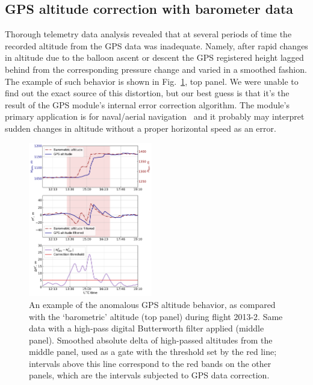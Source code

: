 \documentclass[final,5p,times,twocolumn]{elsarticle}
\begin{document}
\subsection{GPS altitude correction with barometer data}
\label{sect:gps_correction}

Thorough telemetry data analysis revealed that at several periods of time the recorded altitude from the GPS data was inadequate. Namely, after rapid changes in altitude due to the balloon ascent or descent the GPS registered height lagged behind from the corresponding pressure change and varied in a smoothed fashion. The example of such behavior is shown in Fig.~\ref{fig:h_corr}, top panel. We were unable to find out the exact source of this distortion, but our best guess is that it's the result of the GPS module's internal error correction algorithm. The module's primary application is for naval/aerial navigation~\cite{GPS-module-specs} and it probably may interpret sudden changes in altitude without a proper horizontal speed as an error.

\begin{figure}[tb]
    \includegraphics[width=0.48\textwidth]{height_correction.pdf} 
    \caption{An example of the anomalous GPS altitude behavior, as compared with the `barometric' altitude (top panel) during flight 2013-2. Same data with a high-pass digital Butterworth filter applied (middle panel). Smoothed absolute delta of high-passed altitudes from the middle panel, used as a gate with the threshold set by the red line; intervals above this line correspond to the red bands on the other panels, which are the intervals subjected to GPS data correction.}
\label{fig:h_corr}
\end{figure}
\end{document}
